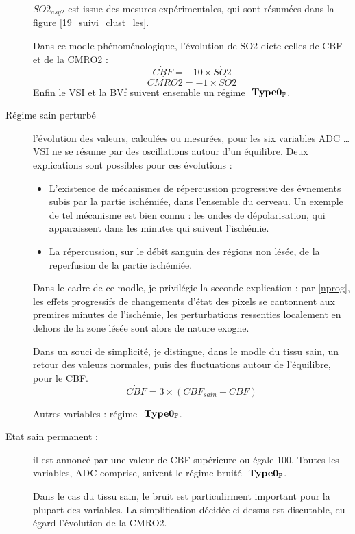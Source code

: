 \begin{description}
$SO2_{asy2}$ est issue des mesures exp\'erimentales, qui sont r\'esum\'ees dans la figure \ref{19_suivi_clust_les}.
\par
Dans ce modle ph\'enom\'enologique, l'\'evolution de SO2 dicte celles de CBF et de la CMRO2 :
\begin{equation}
\dot{CBF}=-10\times\dot{SO2}
\end{equation}
\begin{equation}
\dot{CMRO2}=-1\times\dot{SO2}
\end{equation}
Enfin le VSI et la BVf suivent ensemble un r\'egime $\ \mathbf{Type 0_{\mathbb{P}}}$.
%
\item[R\'egime sain perturb\'e] l'\'evolution des valeurs, calcul\'ees ou mesur\'ees, pour les six variables ADC \dots VSI %
ne se r\'esume par  des oscillations autour d'un \'equilibre. Deux explications sont possibles pour ces \'evolutions :
\begin{itemize}
\item L'existence de m\'ecanismes de r\'epercussion progressive des \'evnements subis par la partie isch\'emi\'ee, %
dans l'ensemble du cerveau. Un exemple de tel m\'ecanisme est bien connu : les ondes de d\'epolarisation, qui apparaissent dans les minutes qui suivent l'isch\'emie.
%
\item La r\'epercussion, sur le d\'ebit sanguin des r\'egions non l\'es\'ee, de la reperfusion de la partie isch\'emi\'ee.
\end{itemize}

\par
Dans le cadre de ce modle, je privil\'egie la seconde explication : par \ref{nprog}, %
les effets progressifs de changements d'\'etat des pixels se cantonnent aux premires minutes de l'isch\'emie, %
les perturbations ressenties localement en dehors de la zone l\'es\'ee sont alors de nature exogne.

\par
Dans un souci de simplicit\'e, je distingue, dans le modle du tissu sain, %
un retour  des valeurs normales, puis des fluctuations autour de l'\'equilibre, pour le CBF.
\begin{equation}
\dot{CBF}=3\times (CBF_{sain}-CBF)
\end{equation}

Autres variables : r\'egime $\ \mathbf{Type 0_{\mathbb{P}}}$.
\item[Etat sain permanent : ] il est annonc\'e par une valeur de CBF sup\'erieure ou \'egale  100. %
Toutes les variables, ADC comprise, suivent le r\'egime bruit\'e $\ \mathbf{Type 0_{\mathbb{P}}}$.

\par
Dans le cas du tissu sain, le bruit est particulirment important pour la plupart des variables. %
La simplification d\'ecid\'ee ci-dessus est discutable, eu \'egard l'\'evolution de la CMRO2.
\end{description}

